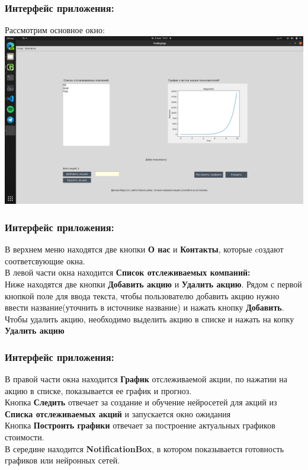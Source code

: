 \documentclass{beamer}
\begin{document}
\begin{frame}
 \frametitle{Интерфейс приложения:}
 Рассмотрим основное окно:
 \includegraphics[scale=0.176]{mainWindow.png}
\end{frame}

\begin{frame}
 \frametitle{Интерфейс приложения:}
 В верхнем меню находятся две кнопки \textbf{О нас} и \textbf{Контакты}, которые cоздают соответсвующие окна.\\
 В левой части окна находится \textbf{Список отслеживаемых компаний:}\\
 Ниже находятся две кнопки \textbf{Добавить акцию} и \textbf{Удалить акцию}. 
 Рядом с первой кнопкой поле для ввода текста, чтобы пользователю добавить акцию нужно ввести название(уточнить в источнике название) и нажать кнопку \textbf{Добавить}.\\
 Чтобы удалить акцию, необходимо выделить акцию в списке и нажать на копку \textbf{Удалить акцию}\\
\end{frame}
\begin{frame} 
 \frametitle{Интерфейс приложения:}
 В правой части окна находится \textbf{График} отслеживаемой акции, по нажатии на акцию в списке, показывается ее график и прогноз.\\
 Кнопка \textbf{Следить} отвечает за создание и обучение нейросетей для акций из \textbf{Списка отслеживаемых акций} и запускается окно ожидания\\
 Кнопка \textbf{Построить графики} отвечает за построение актуальных графиков стоимости.\\
 В середине находится \textbf{NotificationBox}, в котором показывается готовность графиков или нейронных сетей.
\end{frame}
\end{document}
